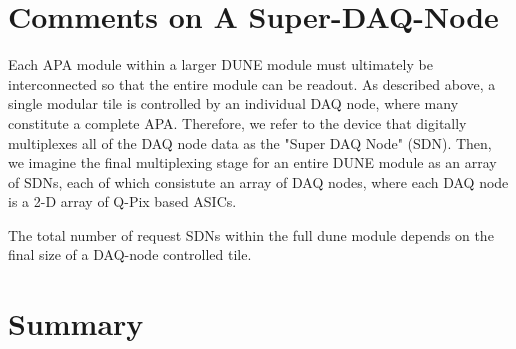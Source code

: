\section{Comments on A Super-DAQ-Node}

Each APA module within a larger DUNE module must ultimately be interconnected so that the entire module can be readout.
As described above, a single modular tile is controlled by an individual DAQ node, where many constitute a complete APA.
Therefore, we refer to the device that digitally multiplexes all of the DAQ node data as the "Super DAQ Node" (SDN).
Then, we imagine the final multiplexing stage for an entire DUNE module as an array of SDNs, each of which consistute an array of DAQ nodes, where each DAQ node is a 2-D array of Q-Pix based ASICs.

The total number of request SDNs within the full dune module depends on the final size of a DAQ-node controlled tile.

\section{Summary}
